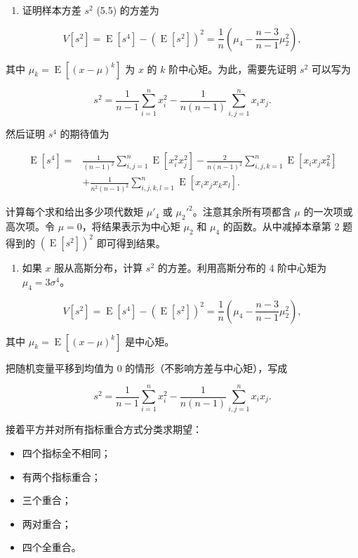 \begin{question}
\begin{enumerate}
\item
  证明样本方差 \(s^2\) (5.5) 的方差为
\end{enumerate}

\[
V[s^2]=\operatorname{E}[s^4]-(\operatorname{E}[s^2])^2=\frac1n\left(\mu_4-\frac{n-3}{n-1}\mu_2^2\right),
\]

其中 \(\mu_k=\operatorname{E}[(x-\mu)^k]\) 为 \(x\) 的 \(k\) 阶中心矩。为此，需要先证明
\(s^2\) 可以写为

\[
s^2=\frac{1}{n-1}\sum_{i=1}^{n}x_i^2-\frac{1}{n(n-1)}\sum_{i,j=1}^{n}x_ix_j.
\]

然后证明 \(s^4\) 的期待值为

\[
\begin{split}
\operatorname{E}[s^4]=&\frac{1}{(n-1)^2}\sum_{i,j=1}^{n}\operatorname{E}[x_i^2x_j^2]
-\frac{2}{n(n-1)^2}\sum_{i,j,k=1}^{n}\operatorname{E}[x_ix_jx_k^2]\\
&+\frac{1}{n^2(n-1)^2}\sum_{i,j,k,l=1}^{n}\operatorname{E}[x_ix_jx_kx_l].
\end{split}
\]

计算每个求和给出多少项代数矩 \(\mu'_4\) 或
\(\mu_2'^2\)。注意其余所有项都含 \(\mu\) 的一次项或高次项。令
\(\mu=0\)，将结果表示为中心矩 \(\mu_2\) 和 \(\mu_4\)
的函数。从中减掉本章第 2 题得到的 \((\operatorname{E}[s^2])^2\) 即可得到结果。

\begin{enumerate}[start=2]
\item
  如果 \(x\) 服从高斯分布，计算 \(s^2\) 的方差。利用高斯分布的 4
  阶中心矩为 \(\mu_4=3\sigma^4\)。
\end{enumerate}
\begin{solution}
\[
V[s^2]=\operatorname{E}[s^4]-(\operatorname{E}[s^2])^2=
\frac1n\left(\mu_4-\frac{n-3}{n-1}\mu_2^2\right),
\]

其中 \(\mu_k=\operatorname{E}[(x-\mu)^k]\) 是中心矩。

把随机变量平移到均值为 0 的情形（不影响方差与中心矩），写成

\[
s^2=\frac1{n-1}\sum_{i=1}^n x_i^2-
\frac1{n(n-1)}\sum_{i,j=1}^n x_ix_j.
\]

接着平方并对所有指标重合方式分类求期望：

\begin{itemize}
\item
  四个指标全不相同；
\item
  有两个指标重合；
\item
  三个重合；
\item
  两对重合；
\item
  四个全重合。
\end{itemize}


\end{solution}
\end{question}
